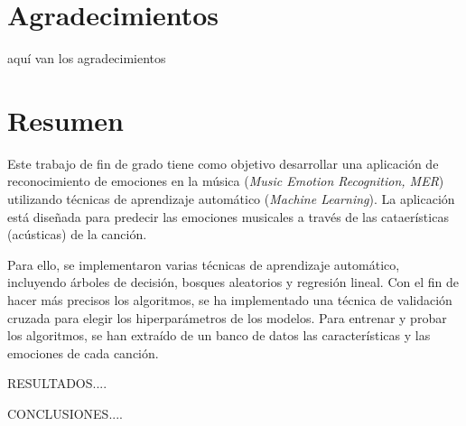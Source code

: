 \documentclass[12pt,a4paper,Spanish]{article}
\newcommand\blankpage{%
	\null
	\thispagestyle{empty}%
	\newpage}
\begin{document}
\section*{Agradecimientos} %

aquí van los agradecimientos









\newpage
\section*{Resumen}
Este trabajo de fin de grado tiene como objetivo desarrollar una aplicación de reconocimiento de emociones en la música (\textit{Music Emotion Recognition, MER}) utilizando técnicas de aprendizaje automático (\textit{Machine Learning}). La aplicación está diseñada para predecir las emociones musicales a través de las cataerísticas (acústicas) de la canción.

Para ello, se implementaron varias técnicas de aprendizaje automático, incluyendo árboles de decisión, bosques aleatorios y regresión lineal. Con el fin de hacer más precisos los algoritmos, se ha implementado una técnica de validación cruzada para elegir los hiperparámetros de los modelos. Para entrenar y probar los algoritmos, se han extraído de un banco de datos las características y las emociones de cada canción.


RESULTADOS....


CONCLUSIONES....









\newpage
\renewcommand*\contentsname{ÍNDICE} %
\tableofcontents
\afterpage{\blankpage} %




\newpage
\renewcommand{\listtablename}{ÍNDICE DE TABLAS} %
\listoftables %
\end{document}
